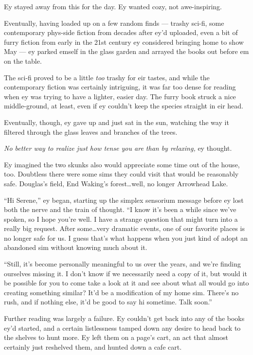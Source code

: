 Ey stayed away from this for the day. Ey wanted cozy, not awe-inspiring.

Eventually, having loaded up on a few random finds — trashy sci-fi, some contemporary phys-side fiction from decades after ey'd uploaded, even a bit of furry fiction from early in the 21st century ey considered bringing home to show May — ey parked emself in the glass garden and arrayed the books out before em on the table.

The sci-fi proved to be a little \emph{too} trashy for eir tastes, and while the contemporary fiction was certainly intriguing, it was far too dense for reading when ey was trying to have a lighter, easier day. The furry book struck a nice middle-ground, at least, even if ey couldn't keep the species straight in eir head.

Eventually, though, ey gave up and just sat in the sun, watching the way it filtered through the glass leaves and branches of the trees.

\emph{No better way to realize just how tense you are than by relaxing,} ey thought.

Ey imagined the two skunks also would appreciate some time out of the house, too. Doubtless there were some sims they could visit that would be reasonably safe. Douglas's field, End Waking's forest\ldots well, no longer Arrowhead Lake.

``Hi Serene,'' ey began, starting up the simplex sensorium message before ey lost both the nerve and the train of thought. ``I know it's been a while since we've spoken, so I hope you're well. I have a strange question that might turn into a really big request. After some\ldots very dramatic events, one of our favorite places is no longer safe for us. I guess that's what happens when you just kind of adopt an abandoned sim without knowing much about it.

``Still, it's become personally meaningful to us over the years, and we're finding ourselves missing it. I don't know if we necessarily need a copy of it, but would it be possible for you to come take a look at it and see about what all would go into creating something similar? It'd be a modification of my home sim. There's no rush, and if nothing else, it'd be good to say hi sometime. Talk soon.''

Further reading was largely a failure. Ey couldn't get back into any of the books ey'd started, and a certain listlessness tamped down any desire to head back to the shelves to hunt more. Ey left them on a page's cart, an act that almost certainly just reshelved them, and hunted down a cafe cart.

